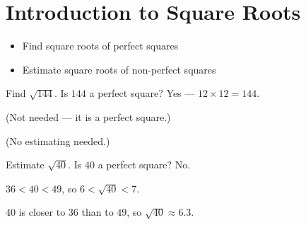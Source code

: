 \section{Introduction to Square Roots}

\begin{stepGoal}
\begin{itemize}
    \item Find square roots of perfect squares
    \item Estimate square roots of non-perfect squares
\end{itemize}
\end{stepGoal}

\begin{stepVocabBox}
\end{stepVocabBox}

\begin{stepsCard}
\end{stepsCard}

\begin{stepExample}{Find $\sqrt{144}$.}
     Is $144$ a perfect square? Yes — $12 \times 12 = 144$.

     (Not needed — it is a perfect square.)

     (No estimating needed.)
\end{stepExample}

\begin{stepExample}{Estimate $\sqrt{40}$.}
     Is $40$ a perfect square? No.

     $36 < 40 < 49$, so $6 < \sqrt{40} < 7$.

     $40$ is closer to $36$ than to $49$, so $\sqrt{40} \approx 6.3$.
\end{stepExample}

